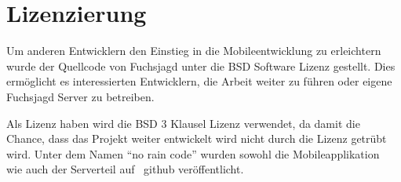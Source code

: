 
\newpage
\section{Lizenzierung} %
\label{sec:Lizenzierung}
Um anderen Entwicklern den Einstieg in die Mobileentwicklung zu erleichtern wurde der Quellcode von Fuchsjagd unter die BSD Software Lizenz gestellt. Dies ermöglicht es interessierten Entwicklern, die Arbeit weiter zu führen oder eigene Fuchsjagd Server zu betreiben.

Als Lizenz haben wird die BSD 3 Klausel Lizenz verwendet, da damit die Chance, dass das Projekt weiter entwickelt wird nicht durch die Lizenz getrübt wird. Unter dem Namen "`no rain code"' wurden sowohl die Mobileapplikation~\cite{bib:sourcemobile} wie auch der Serverteil auf~\cite{bib:sourceserver} github veröffentlicht.
